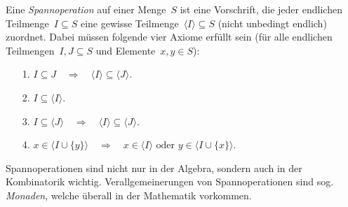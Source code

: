\documentclass{algblatt}
\begin{document}
Eine \emph{Spannoperation} auf einer Menge~$S$ ist eine Vorschrift, die jeder
endlichen Teilmenge~$I \subseteq S$ eine gewisse Teilmenge~$\langle I \rangle
\subseteq S$ (nicht unbedingt endlich) zuordnet. Dabei müssen folgende vier
Axiome erfüllt sein (für alle endlichen Teilmengen~$I,J \subseteq S$ und
Elemente~$x,y \in S$):
\begin{enumerate}
\item[1.] $I \subseteq J \quad\Longrightarrow\quad \langle I \rangle \subseteq
\langle J \rangle$.
\item[2.] $I \subseteq \langle I \rangle$.
\item[3.] $I \subseteq \langle J \rangle \quad\Longrightarrow\quad
\langle I \rangle \subseteq \langle J \rangle$.
\item[4.] $x \in \langle I \cup \{y\} \rangle \quad\Longrightarrow\quad
\text{$x \in \langle I \rangle$ oder $y \in \langle I \cup\{x\} \rangle$}.$
\end{enumerate}

Spannoperationen sind nicht nur in der Algebra, sondern auch in der
Kombinatorik wichtig. Verallgemeinerungen von Spannoperationen sind sog.
\emph{Monaden}, welche überall in der Mathematik vorkommen.
\end{document}
